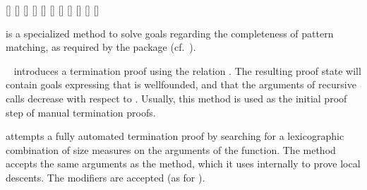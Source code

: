 \begin{isabellebody}
\begin{isamarkuptext}
  \begin{railoutput}
[]
[]
\rail@end
{}
[]
\rail@plus
{}
[]
\rail@endplus
\rail@end
{}
[]
[]
\rail@plus
{}
[]
\rail@endplus
\rail@end
{}
[]
\rail@end
{}
\rail@plus
{}
\rail@bar
{}[]
[]
[]
\rail@endbar
\rail@endplus
\rail@end
\end{railoutput}


  \begin{description}

  \item \hyperlink{method.HOL.pat-completeness}{\mbox{}} is a specialized method to
  solve goals regarding the completeness of pattern matching, as
  required by the \hyperlink{command.HOL.function}{\mbox{}} package (cf.\
  \cite{isabelle-function}).

  \item \hyperlink{method.HOL.relation}{\mbox{}}~ introduces a termination
  proof using the relation .  The resulting proof state will
  contain goals expressing that  is wellfounded, and that the
  arguments of recursive calls decrease with respect to \isa{R}.
  Usually, this method is used as the initial proof step of manual
  termination proofs.

  \item \hyperlink{method.HOL.lexicographic-order}{\mbox{}} attempts a fully
  automated termination proof by searching for a lexicographic
  combination of size measures on the arguments of the function. The
  method accepts the same arguments as the \hyperlink{method.auto}{\mbox{}} method,
  which it uses internally to prove local descents.  The \hyperlink{syntax.clasimpmod}{\mbox{}} modifiers are accepted (as for \hyperlink{method.auto}{\mbox{}}).


\end{description}
\end{isamarkuptext}
\end{isabellebody}
